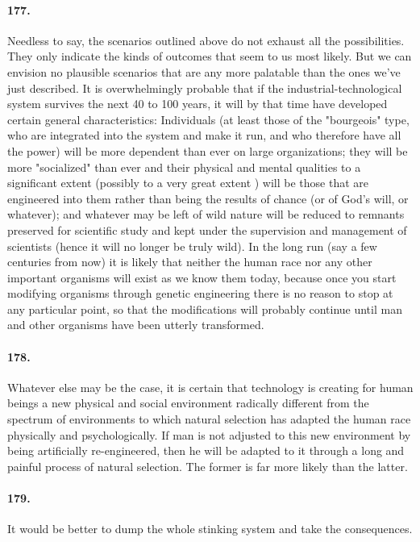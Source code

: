 \documentclass[12pt]{book}
\begin{document}
\paragraph{177.} Needless to say, the scenarios outlined above do not exhaust all the possibilities. They only indicate the kinds of outcomes that seem to us most likely. But we can envision no plausible scenarios that are any more palatable than the ones we've just described. It is overwhelmingly probable that if the industrial-technological system survives the next 40 to 100 years, it will by that time have developed certain general characteristics: Individuals (at least those of the "bourgeois" type, who are integrated into the system and make it run, and who therefore have all the power) will be more dependent than ever on large organizations; they will be more "socialized" than ever and their physical and mental qualities to a significant extent (possibly to a very great extent ) will be those that are engineered into them rather than being the results of chance (or of God's will, or whatever); and whatever may be left of wild nature will be reduced to remnants preserved for scientific study and kept under the supervision and management of scientists (hence it will no longer be truly wild). In the long run (say a few centuries from now) it is likely that neither the human race nor any other important organisms will exist as we know them today, because once you start modifying organisms through genetic engineering there is no reason to stop at any particular point, so that the modifications will probably continue until man and other organisms have been utterly transformed.


\paragraph{178.}  Whatever else may be the case, it is certain that technology is creating for human beings a new physical and social environment radically different from the spectrum of environments to which natural selection has adapted the human race physically and psychologically. If man is not adjusted to this new environment by being artificially re-engineered, then he will be adapted to it through a long and painful process of natural selection.  The former is far more likely than the latter.


\paragraph{179.}  It would be better to dump the whole stinking system and take the consequences.
\end{document}
